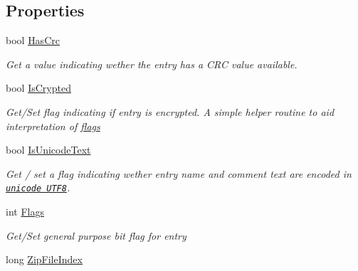 \subsection*{Properties}
\begin{DoxyCompactItemize}
\item 
bool \hyperlink{class_i_c_sharp_code_1_1_sharp_zip_lib_1_1_zip_1_1_zip_entry_a90480b4b2826abfa24da8bb0e12b111e}{Has\+Crc}
\begin{DoxyCompactList}\small\item\em Get a value indicating wether the entry has a C\+RC value available. \end{DoxyCompactList}\item 
bool \hyperlink{class_i_c_sharp_code_1_1_sharp_zip_lib_1_1_zip_1_1_zip_entry_a3bb47622c085083f65c8d158633e2913}{Is\+Crypted}
\begin{DoxyCompactList}\small\item\em Get/\+Set flag indicating if entry is encrypted. A simple helper routine to aid interpretation of \hyperlink{class_i_c_sharp_code_1_1_sharp_zip_lib_1_1_zip_1_1_zip_entry_a144e1d24c10438c31ccffab26073d40b}{flags} \end{DoxyCompactList}\item 
bool \hyperlink{class_i_c_sharp_code_1_1_sharp_zip_lib_1_1_zip_1_1_zip_entry_aa32b0c96d285080ccdd80db5bb22e73c}{Is\+Unicode\+Text}
\begin{DoxyCompactList}\small\item\em Get / set a flag indicating wether entry name and comment text are encoded in \href{http://www.unicode.org}{\tt unicode U\+T\+F8}. \end{DoxyCompactList}\item 
int \hyperlink{class_i_c_sharp_code_1_1_sharp_zip_lib_1_1_zip_1_1_zip_entry_a144e1d24c10438c31ccffab26073d40b}{Flags}
\begin{DoxyCompactList}\small\item\em Get/\+Set general purpose bit flag for entry \end{DoxyCompactList}\item 
long \hyperlink{class_i_c_sharp_code_1_1_sharp_zip_lib_1_1_zip_1_1_zip_entry_ae64189a6a1f6123adcb3a73ed94e2305}{Zip\+File\+Index}

\end{DoxyCompactItemize}
